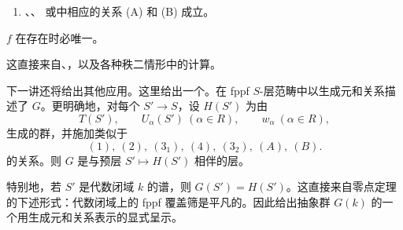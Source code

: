 {\begin{enumerate}
\begin{enumerate}
\begin{equation}
        \tag{\(3_2\)}\label{sga3:xxiii:theorem:3-5-1:equation:3-2}
        \begin{cases}
        (h_\alpha h_\beta)^2
          =f_T(\alpha^*(-1)\beta^*(-1)),
          &(\alpha^*,\beta)=0,\\
        (h_\alpha h_\beta)^3=e,
          &(\alpha^*,\beta)=-1,\\
        (h_\alpha h_\beta)^4=f_T(\alpha^*(-1)),
          &(\alpha^*,\beta)=-2,\\
        (h_\alpha h_\beta)^6=e,
          &(\alpha^*,\beta)=-3;
        \end{cases}
        \end{equation}
      \item[(b)] 、、 或中相应的关系 (A) 和 (B) 成立。
    \end{enumerate}
\end{enumerate}
\(f\) 在存在时必唯一。}

这直接来自、，以及各种秩二情形中的计算。


下一讲还将给出其他应用。这里给出一个。在 fppf \(S\)-层范畴中以生成元和关系描述了 \(G\)。更明确地，对每个 \(S'\to S\)，设 \(H(S')\) 为由
\[
  T(S'),\qquad U_\alpha(S')\ (\alpha\in R),\qquad
  w_\alpha\ (\alpha\in R),
\]
生成的群，并施加类似于
\[
  (1),\ (2),\ (3_1),\ (4),\ (3_2),\ (A),\ (B).
\]
的关系。则 \(G\) 是与预层 \(S'\mapsto H(S')\) 相伴的层。

特别地，若 \(S'\) 是代数闭域 \(k\) 的谱，则 \(G(S')=H(S')\)。这直接来自零点定理的下述形式：代数闭域上的 fppf 覆盖筛是平凡的。因此给出抽象群 \(G(k)\) 的一个用生成元和关系表示的显式呈示。

